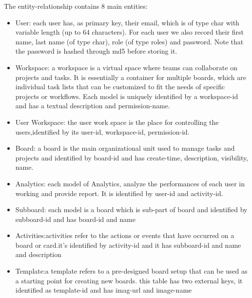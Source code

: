 \noindent The entity-relationship contains 8 main entities:
\begin{itemize}
    \item User: each user has, as primary key, their email, which is of type char with variable length (up to 64 characters). For each user we also record their first name, last name (of type char), role (of type roles) and password. Note that the password is hashed through md5 before storing it.
    \item Workspace: a workspace is a virtual space where teams can collaborate on projects and tasks. It is essentially a container for multiple boards, which are individual task lists that can be customized to fit the needs of specific projects or workflows. Each model is uniquely identified by a workspace-id and has a textual description and permission-name.
    \item User Workspace: the user work space is the place for controlling the users,identified by its user-id, workspace-id, permission-id.
    \item Board: a board is the main organizational unit used to manage tasks and projects and identified by board-id and has create-time, description, visibility, name.
    \item Analytics: each model of Analytics, analyze the performances of each user in working and provide report. It is identified by user-id and activity-id.
    \item Subboard: each model is a board which is sub-part of board and identified by subboard-id and has board-id and name 
    \item Activities:activities refer to the actions or events that have occurred on a board or card.it's identified by activity-id and it has subboard-id and name and description
    \item Template:a template refers to a pre-designed board setup that can be used as a starting point for creating new boards. this table has two external keys, it identified as template-id and has imag-url and image-name
\end{itemize}
